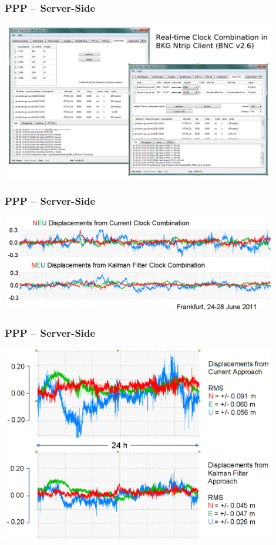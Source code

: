 \documentclass[10pt]{beamer}
\begin{document}

\begin{frame}
\frametitle{PPP -- Server-Side}
  \begin{center}
    \includegraphics[width=0.9\textwidth,angle=0]{combination_1.png}
  \end{center}
\end{frame}


\begin{frame}
\frametitle{PPP -- Server-Side}
  \begin{center}
    \includegraphics[width=0.9\textwidth,angle=0]{combination_2.png}
  \end{center}
\end{frame}


\begin{frame}
\frametitle{PPP -- Server-Side}
  \begin{center}
    \includegraphics[width=0.9\textwidth,angle=0]{combination_3.png}
  \end{center}
\end{frame}
\end{document}
